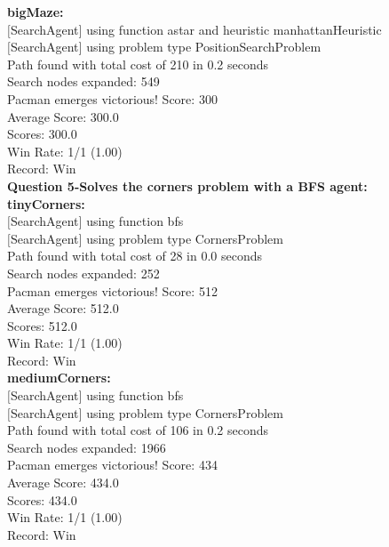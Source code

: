 \documentclass[11pt]{article}
\begin{document}
\noindent
\textbf{bigMaze:}\\
$[$SearchAgent$]$ using function astar and heuristic manhattanHeuristic\\
$[$SearchAgent$]$ using problem type PositionSearchProblem\\
Path found with total cost of 210 in 0.2 seconds\\
Search nodes expanded: 549\\
Pacman emerges victorious! Score: 300\\
Average Score: 300.0\\
Scores:        300.0\\
Win Rate:      1/1 (1.00)\\
Record:        Win\\

\newpage
\noindent
\textbf{Question 5-Solves the corners problem with a BFS agent:}\\
\textbf{tinyCorners:}\\
$[$SearchAgent$]$ using function bfs\\
$[$SearchAgent$]$ using problem type CornersProblem\\
Path found with total cost of 28 in 0.0 seconds\\
Search nodes expanded: 252\\
Pacman emerges victorious! Score: 512\\
Average Score: 512.0\\
Scores:        512.0\\
Win Rate:      1/1 (1.00)\\
Record:        Win\\

\noindent
\textbf{mediumCorners:}\\
$[$SearchAgent$]$ using function bfs\\
$[$SearchAgent$]$ using problem type CornersProblem\\
Path found with total cost of 106 in 0.2 seconds\\
Search nodes expanded: 1966\\
Pacman emerges victorious! Score: 434\\
Average Score: 434.0\\
Scores:        434.0\\
Win Rate:      1/1 (1.00)\\
Record:        Win\\
\end{document}
